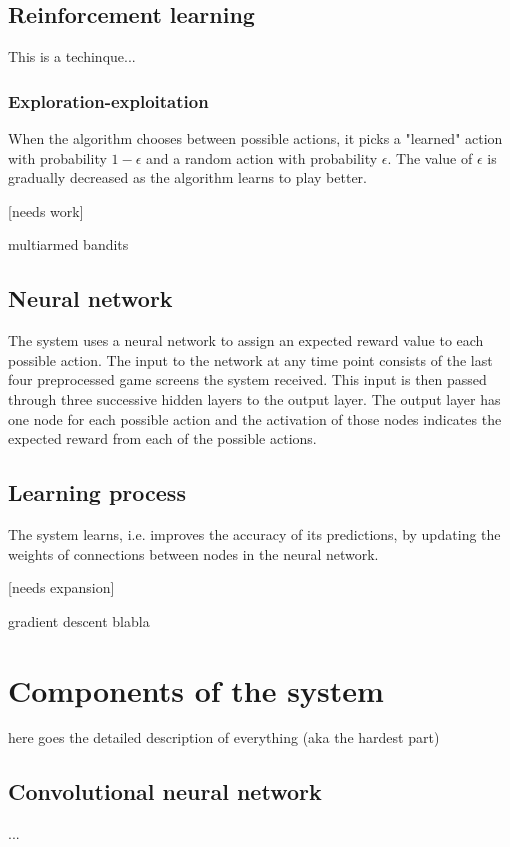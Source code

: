 \documentclass[a4paper,12pt]{article}
\begin{document}
\subsection{Reinforcement learning}
This is a techinque... 

\subsubsection{Exploration-exploitation}
When the algorithm chooses between possible actions, it picks a "learned" action with probability $1-\epsilon$ and a random action with probability $\epsilon$. The value of $\epsilon$ is gradually decreased as the algorithm learns to play better.

[needs work]

multiarmed bandits

\subsection{Neural network}
The system uses a neural network to assign an expected reward value to each possible action. The input to the network at any time point consists of the last four preprocessed game screens the system received. This input is then passed through three successive hidden layers to the output layer. The output layer has one node for each possible action and the activation of those nodes indicates the expected reward from each of the possible actions.

\subsection{Learning process}
The system learns, i.e. improves the accuracy of its predictions, by updating the weights of connections between nodes in the neural network.

[needs expansion]

gradient descent blabla



%
%
\pagebreak
\section{Components of the system}
here goes the detailed description of everything (aka the hardest part)

\subsection{Convolutional neural network}
...
\end{document}
